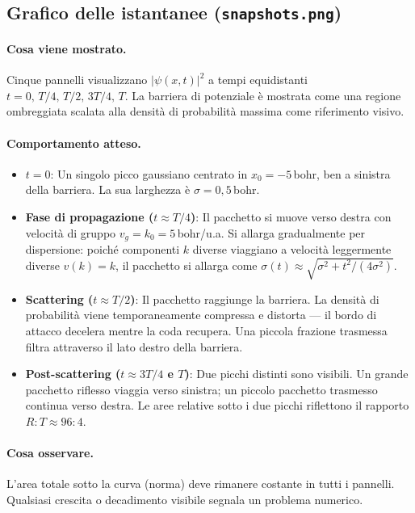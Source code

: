 \documentclass[12pt, a4paper]{article}
\begin{document}
\subsection{Grafico delle istantanee (\texttt{snapshots.png})}

\paragraph{Cosa viene mostrato.}
Cinque pannelli visualizzano $|\psi(x,t)|^2$ a tempi equidistanti
$t = 0,\, T/4,\, T/2,\, 3T/4,\, T$.
La barriera di potenziale è mostrata come una regione ombreggiata scalata
alla densità di probabilità massima come riferimento visivo.

\paragraph{Comportamento atteso.}
\begin{itemize}
  \item \textbf{$t = 0$}: Un singolo picco gaussiano centrato in $x_0 = -5$\,bohr,
        ben a sinistra della barriera. La sua larghezza è $\sigma = 0{,}5$\,bohr.

  \item \textbf{Fase di propagazione ($t \approx T/4$)}: Il pacchetto si muove
        verso destra con velocità di gruppo $v_g = k_0 = 5$\,bohr/u.a. Si
        allarga gradualmente per dispersione: poiché componenti $k$ diverse
        viaggiano a velocità leggermente diverse $v(k) = k$, il pacchetto
        si allarga come $\sigma(t) \approx \sqrt{\sigma^2 + t^2/(4\sigma^2)}$.

  \item \textbf{Scattering ($t \approx T/2$)}: Il pacchetto raggiunge la
        barriera. La densità di probabilità viene temporaneamente compressa
        e distorta — il bordo di attacco decelera mentre la coda recupera.
        Una piccola frazione trasmessa filtra attraverso il lato destro
        della barriera.

  \item \textbf{Post-scattering ($t \approx 3T/4$ e $T$)}: Due picchi distinti
        sono visibili. Un grande pacchetto riflesso viaggia verso sinistra;
        un piccolo pacchetto trasmesso continua verso destra. Le aree relative
        sotto i due picchi riflettono il rapporto $R:T \approx 96:4$.
\end{itemize}

\paragraph{Cosa osservare.}
L'area totale sotto la curva (norma) deve rimanere costante in tutti i
pannelli. Qualsiasi crescita o decadimento visibile segnala un problema
numerico.
\end{document}
